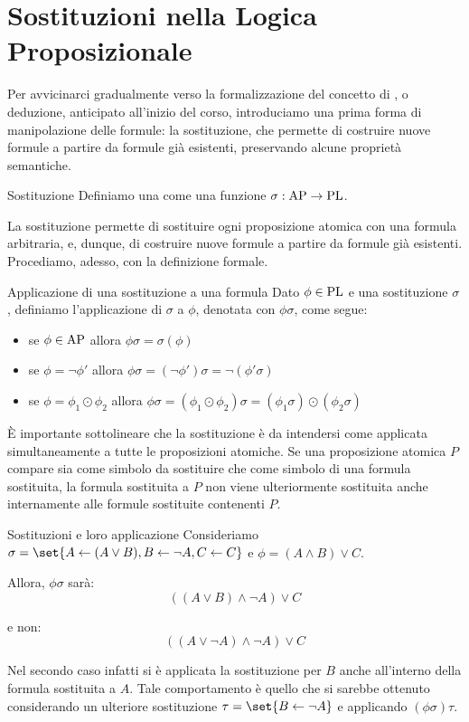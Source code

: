 \section{Sostituzioni nella Logica Proposizionale}

Per avvicinarci gradualmente verso la formalizzazione del concetto di , o deduzione, anticipato all'inizio del corso, introduciamo una prima forma di manipolazione delle formule: la sostituzione, che permette di costruire nuove formule a partire da formule già esistenti, preservando alcune proprietà semantiche.

\begin{definition}{Sostituzione}
  Definiamo una  come una funzione \(\sigma: \AP \to \PL\).
\end{definition}

La sostituzione permette di sostituire ogni proposizione atomica con una formula arbitraria, e, dunque, di costruire nuove formule a partire da formule già esistenti. Procediamo, adesso, con la definizione formale.

\begin{definition}{Applicazione di una sostituzione a una formula}
  Dato \(\phi \in \operatorname{PL}\) e una sostituzione \(\sigma\), definiamo l'applicazione di \(\sigma\) a \(\phi\), denotata con \(\phi\sigma\), come segue:
  \begin{itemize}
   \item se \(\phi \in \AP\) allora \(\phi\sigma = \sigma(\phi)\)
   \item se \(\phi = \neg \phi'\) allora \(\phi\sigma = (\neg \phi ')\sigma = \neg (\phi'\sigma)\)
   \item se \(\phi = \phi_1 \odot \phi_2\) allora \(\phi\sigma = (\phi_1 \odot \phi_2)\sigma = (\phi_1\sigma) \odot (\phi_2\sigma)\)
  \end{itemize}
\end{definition}

\begin{note}{}
  È importante sottolineare che la sostituzione è da intendersi come applicata simultaneamente a tutte le proposizioni atomiche. Se una proposizione atomica \(P\) compare sia come simbolo da sostituire che come simbolo di una formula sostituita, la formula sostituita a \(P\) non viene ulteriormente sostituita anche internamente alle formule sostituite contenenti \(P\).
\end{note}

\begin{example}{Sostituzioni e loro applicazione}  
  Consideriamo \(\sigma = \set{A \leftarrow (A\lor B), B \leftarrow \neg A, C \leftarrow C}\) e \(\phi = (A \land B) \lor C\).
  
  Allora, \(\phi\sigma\) sarà:
  \[((A\lor B) \land \neg A) \lor C\]

  e non:
  \[((A\lor \neg A)\land \neg A)\lor C\]

  Nel secondo caso infatti si è applicata la sostituzione per \(B\) anche all'interno della formula sostituita a \(A\). Tale comportamento è quello che si sarebbe ottenuto considerando un ulteriore sostituzione \(\tau = \set{B\leftarrow \neg A}\) e applicando \((\phi\sigma)\tau\).
\end{example}

